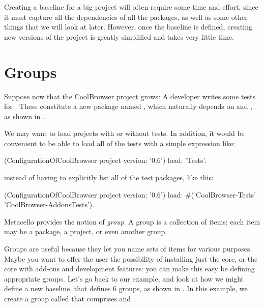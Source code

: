 \documentclass[a4paper,10pt,twoside]{book}
\begin{document}
Creating a baseline for a big project will often require some time and effort, since it must capture all the dependencies of all the packages, as well as some other things that we will look at later.
However, once the baseline is defined, creating new versions of the project is greatly simplified and takes very little time.

\section{Groups}
Suppose now that the CoolBrowser project grows: A developer writes some tests for .  These constitute a new package named , which naturally depends on  and , as shown in .

We may want to load projects with or without tests. In addition, it would be convenient to be able to load all of the tests with a simple expression like:

\begin{code}{}
(ConfigurationOfCoolBrowser project version: '0.6') load: 'Tests'.
\end{code}

instead of having to explicitly list all of the test packages, like this:

\begin{code}{}
(ConfigurationOfCoolBrowser project version: '0.6')
       load: #('CoolBrowser-Tests' 'CoolBrowser-AddonsTests').
\end{code}

Metacello provides the notion of \emph{group}. A group is a collection of items; each item may be a package, a project, or even another group.

Groups are useful because they let you name sets of items for various purposes. Maybe you want to offer the  user the possibility of installing just the core, or the core with add-ons and development features: you can make this easy be defining appropriate groups.  Let's go back to our example, and look at how we might define a new baseline,  that defines 6 groups, as shown in . In this example, we create a group called  that comprises  and .
\end{document}
